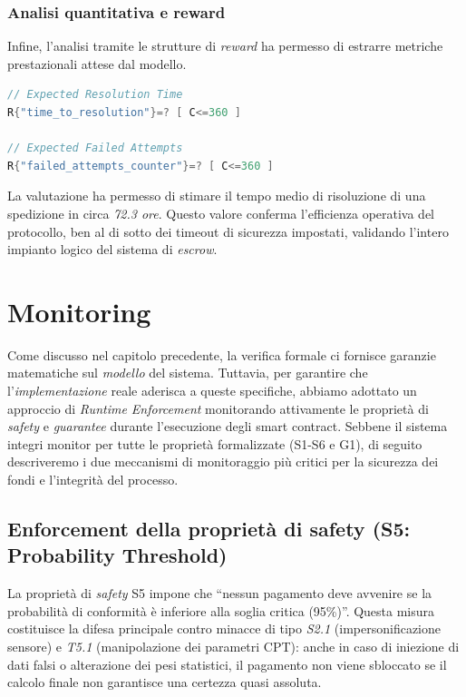 \subsubsection{Analisi quantitativa e reward}
Infine, l'analisi tramite le strutture di \textit{reward} ha permesso di estrarre metriche prestazionali attese dal modello.

\begin{lstlisting}[caption={Proprietà di Reward}, label={lst:pctl_rewards}, language=C]
// Expected Resolution Time
R{"time_to_resolution"}=? [ C<=360 ]

// Expected Failed Attempts
R{"failed_attempts_counter"}=? [ C<=360 ]
\end{lstlisting}

La valutazione ha permesso di stimare il tempo medio di risoluzione di una spedizione in circa \textit{72.3 ore}. Questo valore conferma l'efficienza operativa del protocollo, ben al di sotto dei timeout di sicurezza impostati, validando l'intero impianto logico del sistema di \textit{escrow}.

\section{Monitoring}
\label{sec:runtime_enforcement}
Come discusso nel capitolo precedente, la verifica formale ci fornisce garanzie matematiche sul \textit{modello} del sistema. Tuttavia, per garantire che l'\textit{implementazione} reale aderisca a queste specifiche, abbiamo adottato un approccio di \textit{Runtime Enforcement} monitorando attivamente le proprietà di \textit{safety} e \textit{guarantee} durante l'esecuzione degli smart contract. Sebbene il sistema integri monitor per tutte le proprietà formalizzate (S1-S6 e G1), di seguito descriveremo i due meccanismi di monitoraggio più critici per la sicurezza dei fondi e l'integrità del processo.

\subsection{Enforcement della proprietà di safety (S5: Probability Threshold)}
La proprietà di \textit{safety} S5 impone che ``nessun pagamento deve avvenire se la probabilità di conformità è inferiore alla soglia critica (95\%)''. Questa misura costituisce la difesa principale contro minacce di tipo \textit{S2.1} (impersonificazione sensore) e \textit{T5.1} (manipolazione dei parametri CPT): anche in caso di iniezione di dati falsi o alterazione dei pesi statistici, il pagamento non viene sbloccato se il calcolo finale non garantisce una certezza quasi assoluta.

